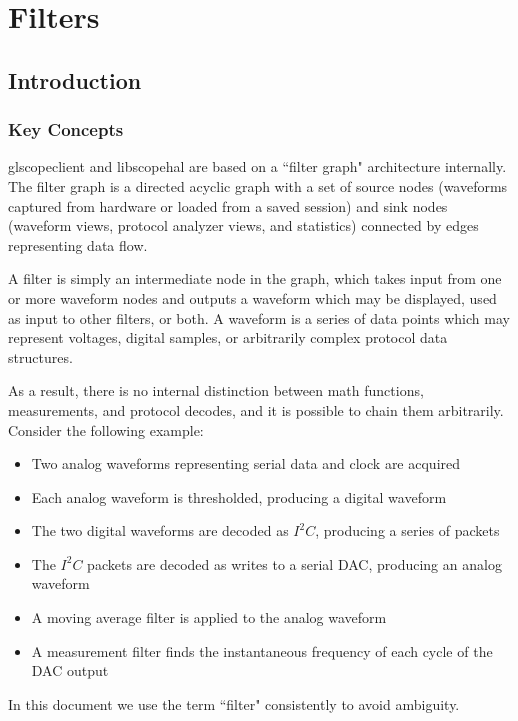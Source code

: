 \chapter{Filters}

\section{Introduction}

\subsection{Key Concepts}

glscopeclient and libscopehal are based on a ``filter graph" architecture internally. The filter graph is a directed
acyclic graph with a set of source nodes (waveforms captured from hardware or loaded from a saved session) and sink
nodes (waveform views, protocol analyzer views, and statistics) connected by edges representing data flow.

A filter is simply an intermediate node in the graph, which takes input from one or more waveform nodes and outputs a
waveform which may be displayed, used as input to other filters, or both. A waveform is a series of data points which
may represent voltages, digital samples, or arbitrarily complex protocol data structures.

As a result, there is no internal distinction between math functions, measurements, and protocol decodes, and it is
possible to chain them arbitrarily. Consider the following example:

\begin{itemize}
\item Two analog waveforms representing serial data and clock are acquired
\item Each analog waveform is thresholded, producing a digital waveform
\item The two digital waveforms are decoded as $I^2C$, producing a series of packets
\item The $I^2C$ packets are decoded as writes to a serial DAC, producing an analog waveform
\item A moving average filter is applied to the analog waveform
\item A measurement filter finds the instantaneous frequency of each cycle of the DAC output
\end{itemize}

In this document we use the term ``filter" consistently to avoid ambiguity.

